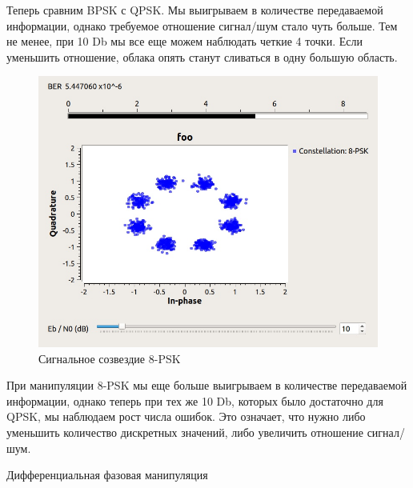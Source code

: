 	Теперь сравним BPSK с QPSK. Мы выигрываем в количестве передаваемой информации, однако требуемое отношение сигнал/шум стало чуть больше. Тем не менее, при 10 Db мы все еще можем наблюдать четкие 4 точки. Если уменьшить отношение, облака опять станут сливаться в одну большую область.

	\begin{figure}[H]
		\begin{center}
			\includegraphics[scale=0.4]{../8psk.jpg}
			\caption{Сигнальное созвездие 8-PSK} 
		\end{center}
	\end{figure}

	При манипуляции 8-PSK мы еще больше выигрываем в количестве передаваемой информации, однако теперь при тех же 10 Db, которых было достаточно для QPSK, мы наблюдаем рост числа ошибок. Это означает, что нужно либо уменьшить количество дискретных значений, либо увеличить отношение сигнал/шум.
	
	\begin{center}
		\large {Дифференциальная фазовая манипуляция}
	\end{center}
	
